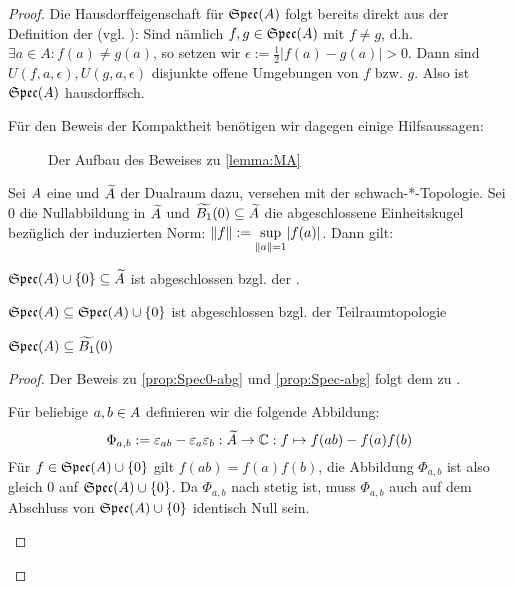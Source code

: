 \begin{proof}
Die Hausdorffeigenschaft für $\mathfrak{Spec}(A)$ folgt bereits direkt aus der Definition der \ssTop{} (vgl. \cite[Lemma 2.1.27 b)]{Baer2003}): Sind nämlich $f, g \in \mathfrak{Spec}(A)$ mit $f \neq g$, d.h. $\exists a\in A: f(a) \neq g(a)$, so setzen wir $\epsilon := \frac{1}{2} |f(a) - g(a)| > 0$. Dann sind $U(f, a, \epsilon), U(g, a, \epsilon)$ disjunkte offene Umgebungen von $f$ bzw. $g$. Also ist $\mathfrak{Spec}(A)$ hausdorffsch.

Für den Beweis der Kompaktheit benötigen wir dagegen einige Hilfsaussagen:

\begin{figure}[h]
	
	\caption{Der Aufbau des Beweises zu \cref*{lemma:MA}}
\end{figure}


\begin{prop}
Sei $A$ eine \CAlg{} und $\widetilde{A}$ der Dualraum dazu, versehen mit der schwach-*-Topologie. Sei $0$ die Nullabbildung in $\widetilde{A}$ und $\widetilde{B_1}(0) \subseteq \widetilde{A}$ die abgeschlossene Einheitskugel bezüglich der induzierten Norm: $\left\lVert f\right\rVert := \underset{\left\lVert a\right\rVert = 1}{\sup}|f(a)|$. Dann gilt:
\begin{propenum}
	\item $\mathfrak{Spec}(A) \cup \{0\} \subseteq \widetilde{A}$ ist abgeschlossen bzgl. der \ssTop. 					\label{prop:Spec0-abg} 
	\item $\mathfrak{Spec}(A) \subseteq \mathfrak{Spec}(A) \cup \{0\}$ ist abgeschlossen bzgl. der Teilraumtopologie		\label{prop:Spec-abg} 
	\item $\mathfrak{Spec}(A) \subseteq \widetilde{B_1}(0)$																\label{prop:Spec-in-B0} 
\end{propenum}
\end{prop}

\begin{proof}Der Beweis zu \ref*{prop:Spec0-abg} und \ref*{prop:Spec-abg} folgt dem zu \cite[Lemma 2.1.27 a), d)]{Baer2003}.
\begin{proofenum} 
	\item %
	Für beliebige $a, b \in A$ definieren wir die folgende Abbildung:
	\[\Phi_{a,b} := \varepsilon_{ab}-\varepsilon_a \varepsilon_b : \widetilde{A} \to \mathbb{C}: f \mapsto f(ab)-f(a)f(b)\]
	Für $f \in \mathfrak{Spec}(A) \cup \{0\}$ gilt $f(ab) = f(a)f(b)$, die Abbildung $\Phi_{a,b}$ ist also gleich 0 auf $\mathfrak{Spec}(A) \cup \{0\}$. Da $\Phi_{a,b}$ nach  stetig ist, muss $\Phi_{a,b}$ auch auf dem Abschluss von $\mathfrak{Spec}(A) \cup \{0\}$ identisch Null sein. 
	

\end{proofenum}
\end{proof}
\end{proof}
